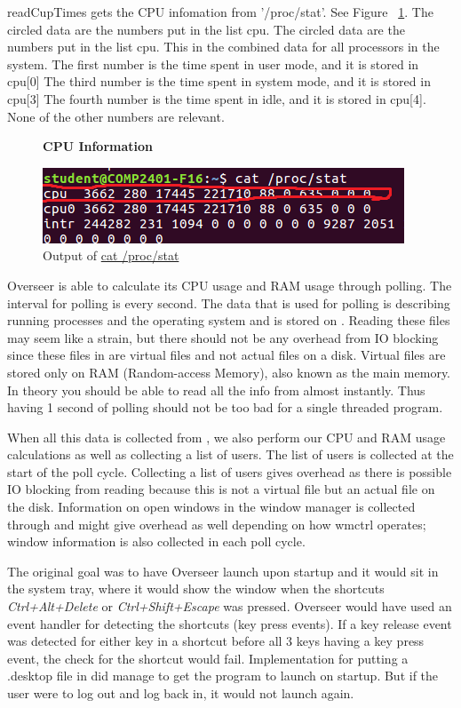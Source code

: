 \documentclass[12pt]{article}
\begin{document}
readCupTimes gets the CPU infomation from '/proc/stat'.
See Figure ~\ref{figCPUInfo}.
The circled data are the numbers put in the list cpu.
The circled data are the numbers put in the list cpu.
This in the combined data for all processors in the system.
The first number is the time spent in user mode, and it is stored in cpu[0]
The third number is the time spent in system mode, and it is stored in cpu[3]
The fourth number is the time spent in idle, and it is stored in cpu[4].
None of the other numbers are relevant.
\begin{figure}[h]
	\centering
	\textbf{CPU Information}\par\medskip
	\includegraphics{totalCPU}
	\caption{Output of \url{cat /proc/stat}}
	\label{figCPUInfo}
\end{figure}

Overseer is able to calculate its CPU usage and RAM usage through polling.
The interval for polling is every second.
The data that is used for polling is describing running processes and the operating system and is stored on .
Reading these files may seem like a strain, but there should not be any overhead from IO blocking since these files in  are virtual files and not actual files on a disk.
Virtual files are stored only on RAM (Random-access Memory), also known as the main memory.
In theory you should be able to read all the info from  almost instantly.
Thus having 1 second of polling should not be too bad for a single threaded program.

When all this data is collected from , we also perform our CPU and RAM usage calculations as well as collecting a list of users.
The list of users is collected at the start of the poll cycle.
Collecting a list of users gives overhead as there is possible IO blocking from reading  because this is not a virtual file but an actual file on the disk.
Information on open windows in the window manager is collected through  and might give overhead as well depending on how wmctrl operates; window information is also collected in each poll cycle.

The original goal was to have Overseer launch upon startup and it would sit in the system tray, where it would show the window when the shortcuts \emph{Ctrl+Alt+Delete} or \emph{Ctrl+Shift+Escape} was pressed.
Overseer would have used an event handler for detecting the shortcuts (key press events).
If a key release event was detected for either key in a shortcut before all 3 keys having a key press event, the check for the shortcut would fail.
Implementation for putting a .desktop file in  did manage to get the program to launch on startup. But if the user were to log out and log back in, it would not launch again.
\end{document}
